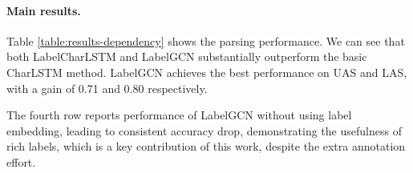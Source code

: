 \paragraph{Main results.}

Table \ref{table:results-dependency} shows the parsing performance. We can see that both LabelCharLSTM and LabelGCN substantially outperform the basic CharLSTM method. 
LabelGCN achieves the best performance on UAS and LAS, with a gain of 0.71 and 0.80 respectively. 

The fourth row reports performance of LabelGCN without using label embedding, leading to consistent accuracy drop, demonstrating the usefulness of rich labels, which is a key contribution of this work, despite the extra annotation effort. 




